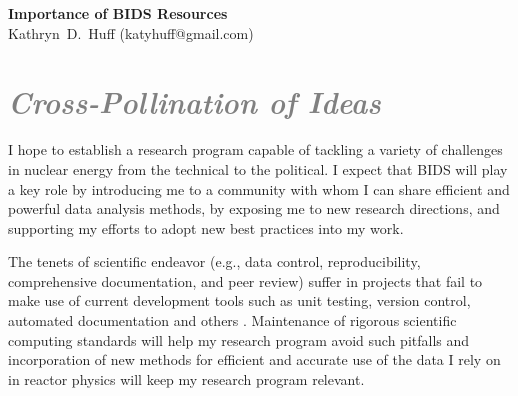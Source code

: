\documentclass[a4paper, 12pt]{article}
\makeatletter
\newcommand{\authorname}{Kathryn~D.~Huff }
\newcommand{\authoremail}{katyhuff@gmail.com}
\newcommand{\authorsite}{katyhuff.github.com}
\makeatother
\begin{document}
\pagestyle{fancy}
\lhead{\textcolor{gray}{\it \authorname}}
\rhead{\textcolor{gray}{\thepage/\totalpages{}}}
\renewcommand{\headrulewidth}{0pt} 
\renewcommand{\footrulewidth}{0pt} 
\fancyfoot[C]{\footnotesize \textcolor{gray}{\authorsite}} 

\begin{center}
{\LARGE \bf Importance of BIDS Resources}\\
\vspace*{0.1cm}
{\normalsize \authorname (\authoremail)}
\end{center}




\section*{\textcolor{gray}{\it Cross-Pollination of Ideas}}
I hope to establish a research program capable of tackling a 
variety of challenges in nuclear energy from the technical to the political.  
I expect that BIDS will play a key role by introducing me to a 
community with whom I can share efficient and powerful 
data analysis methods, by exposing me to new research directions, and 
supporting my efforts to adopt new best practices into my work.

The tenets of scientific endeavor (e.g., data control, reproducibility, 
comprehensive documentation, and peer review) suffer in projects that fail to 
make use of current development tools such as unit testing, version control, 
automated documentation and others \cite{wilson_best_2014, 
merali_computational_2010}.  Maintenance of rigorous scientific computing 
standards will help my research program avoid such pitfalls 
\cite{huff_rapid_2011} and incorporation of new methods for efficient and 
accurate use of the data I rely on in reactor physics will keep my research 
program relevant.
\end{document}

